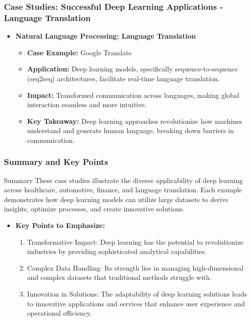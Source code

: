 \documentclass[aspectratio=169]{beamer}
\begin{document}
\begin{frame}[fragile]
    \frametitle{Case Studies: Successful Deep Learning Applications - Language Translation}
    \begin{itemize}
        \item \textbf{Natural Language Processing: Language Translation}
        \begin{itemize}
            \item \textbf{Case Example:} Google Translate
            \item \textbf{Application:} 
            Deep learning models, specifically sequence-to-sequence (seq2seq) architectures, facilitate real-time language translation.
            \item \textbf{Impact:} 
            Transformed communication across languages, making global interaction seamless and more intuitive.
            \item \textbf{Key Takeaway:} 
            Deep learning approaches revolutionize how machines understand and generate human language, breaking down barriers in communication.
        \end{itemize}
    \end{itemize}
\end{frame}

\begin{frame}[fragile]
    \frametitle{Summary and Key Points}
    \begin{block}{Summary}
        These case studies illustrate the diverse applicability of deep learning across healthcare, automotive, finance, and language translation. 
        Each example demonstrates how deep learning models can utilize large datasets to derive insights, optimize processes, and create innovative solutions.
    \end{block}
    
    \begin{itemize}
        \item \textbf{Key Points to Emphasize:}
        \begin{enumerate}
            \item Transformative Impact: Deep learning has the potential to revolutionize industries by providing sophisticated analytical capabilities.
            \item Complex Data Handling: Its strength lies in managing high-dimensional and complex datasets that traditional methods struggle with.
            \item Innovation in Solutions: The adaptability of deep learning solutions leads to innovative applications and services that enhance user experience and operational efficiency.
        \end{enumerate}
    \end{itemize}
\end{frame}
\end{document}
